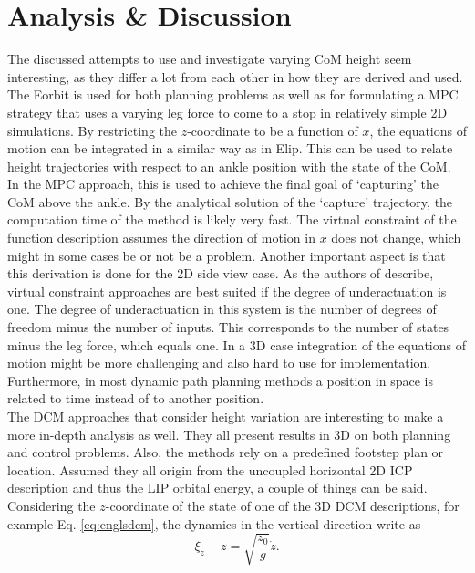 \section{Analysis \& Discussion}
The discussed attempts to use and investigate varying \ac{CoM} height seem interesting, as they differ a lot from each other in how they are derived and used. \\
The \ac{Eorbit} is used for both planning problems as well as for formulating a \ac{MPC} strategy that uses a varying leg force to come to a stop in relatively simple \ac{2D} simulations. By restricting the $z$-coordinate to be a function of $x$, the equations of motion can be integrated in a similar way as in \ac{Elip}. This can be used to relate height trajectories with respect to an ankle position with the state of the \ac{CoM}. In the \ac{MPC} approach, this is used to achieve the final goal of `capturing' the \ac{CoM} above the ankle. By the analytical solution of the `capture' trajectory, the computation time of the method is likely very fast. The virtual constraint of the function description assumes the direction of motion in $x$ does not change, which might in some cases be or not be a problem. Another important aspect is that this derivation is done for the \ac{2D} side view case. As the authors of \cite{koolen2016balance} describe, virtual constraint approaches are best suited if the degree of underactuation is one. The degree of underactuation in this system is the number of degrees of freedom minus the number of inputs. This corresponds to the number of states minus the leg force, which equals one. In a \ac{3D} case integration of the equations of motion might be more challenging and also hard to use for implementation. Furthermore, in most dynamic path planning methods a position in space is related to time instead of to another position.  \\
The \ac{DCM} approaches that consider height variation are interesting to make a more in-depth analysis as well. They all present results in \ac{3D} on both planning and control problems. Also, the methods rely on a predefined footstep plan or location. Assumed they all origin from the uncoupled horizontal \ac{2D} \ac{ICP} description and thus the \ac{LIP} orbital energy, a couple of things can be said. Considering the $z$-coordinate of the state of one of the \ac{3D} \ac{DCM} descriptions, for example Eq. \eqref{eq:englsdcm}, the dynamics in the vertical direction write as
\begin{equation}
\xi_z - z= \sqrt{\frac{z_0}{g}}\dot{z}.
\end{equation}
